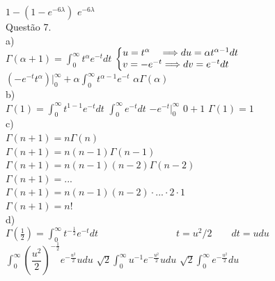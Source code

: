 \documentclass[12pt]{article}
\begin{document}
$1-(1-e^{-6\lambda})$\qquad\qquad
$e^{-6\lambda}$\\

\noindent Questão 7.\\

\noindent a)\\

$\Gamma(\alpha+1)=\displaystyle\int_{0}^{\infty}t^{\alpha}e^{-t}dt$\qquad\qquad
$\left\{\begin{array}{@{}l@{}}
	u=t^{\alpha}\quad\Longrightarrow du=\alpha t^{\alpha-1}dt\\
	v=-e^{-t}\Longrightarrow dv=e^{-t}dt
\end{array}\right.$\\

$(-e^{-t}t^{\alpha})\biggr|_{0}^{\infty}+\alpha\displaystyle\int_{0}^{\infty}t^{\alpha-1}e^{-t}$\qquad\qquad
$\alpha\Gamma(\alpha)$\\

\noindent b)\\

$\Gamma(1)=\displaystyle\int_{0}^{\infty}t^{1-1}e^{-t}dt$\qquad\qquad
$\displaystyle\int_{0}^{\infty}e^{-t}dt$\qquad\qquad
$-e^{-t}\biggr|_{0}^{\infty}$\qquad\qquad
$0+1$\qquad\qquad
$\Gamma(1)=1$\\

\noindent c)\\

$\Gamma(n+1)=n\Gamma(n)$\\

$\Gamma(n+1)=n(n-1)\Gamma(n-1)$\\

$\Gamma(n+1)=n(n-1)(n-2)\Gamma(n-2)$\\

$\Gamma(n+1)= ...$\\

$\Gamma(n+1)=n(n-1)(n-2)\cdot...\cdot2\cdot1$\\

$\Gamma(n+1)=n!$\\

\noindent d)\\

$\Gamma\left(\frac{1}{2}\right)=\displaystyle\int_{0}^{\infty}t^{-\frac{1}{2}}e^{-t}dt\qquad\qquad\qquad\qquad t=u^{2}/2\qquad dt=udu$\\

$\displaystyle\int_{0}^{\infty}\left(\dfrac{u^{2}}{2}\right)^{-\frac{1}{2}}e^{-\frac{u^2}{2}} udu$\qquad\qquad
$\sqrt{2}\displaystyle\int_{0}^{\infty}u^{-1}e^{-\frac{u^2}{2}}udu$\qquad\qquad
$\sqrt{2}\displaystyle\int_{0}^{\infty}e^{-\frac{u^2}{2}}du$\\
\end{document}
